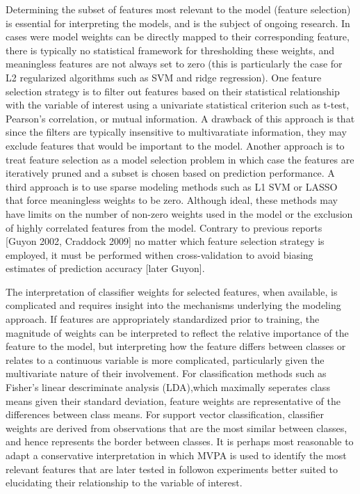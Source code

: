\documentclass[5p]{elsarticle}
\begin{document}
Determining the subset of features most relevant to the model (feature
selection) is essential for interpreting the models, and is the subject of
ongoing research. In cases were model weights can be directly mapped to their
corresponding feature, there is typically no statistical framework for
thresholding these weights, and meaningless features are not always set to zero
(this is particularly the case for L2 regularized algorithms such as SVM and
ridge regression). One feature selection strategy is to filter out features
based on their statistical relationship with the variable of interest using a
univariate statistical criterion such as t-test, Pearson's correlation, or
mutual information.  A drawback of this approach is that since the filters are
typically insensitive to multivaratiate information, they may exclude features
that would be important to the model.  Another approach is to treat feature
selection as a model selection problem in which case the features are
iteratively pruned and a subset is chosen based on prediction performance. A
third approach is to use sparse modeling methods such as L1 SVM or LASSO that
force meaningless weights to be zero.  Although ideal, these methods may have
limits on the number of non-zero weights used in the model or the exclusion of
highly correlated features from the model.  Contrary to previous reports [Guyon
2002, Craddock 2009] no matter which feature selection strategy is employed, it
must be performed withen cross-validation to avoid biasing estimates of
prediction accuracy [later Guyon].

The interpretation of classifier weights for selected features, when available,
is complicated and requires insight into the mechanisms underlying the modeling
approach. If features are appropriately standardized prior to training, the
magnitude of weights can be interpreted to reflect the relative importance of
the feature to the model, but interpreting how the feature differs between
classes or relates to a continuous variable is more complicated, particularly
given the multivariate nature of their involvement.  For classification methods
such as Fisher's linear descriminate analysis (LDA),which maximally seperates
class means given their standard deviation, feature weights are representative
of the differences between class means. For support vector classification,
classifier weights are derived from observations that are the most similar
between classes, and hence represents the border between classes.  It is perhaps
most reasonable to adapt a conservative interpretation in which MVPA is used to
identify the most relevant features that are later tested in followon
experiments better suited to elucidating their relationship to the variable of
interest.
\end{document}
